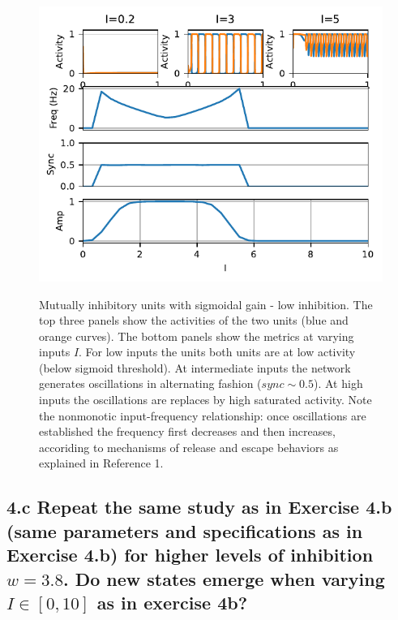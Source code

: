 \documentclass{cmc}
\begin{document}

\begin{figure}
	\centering \includegraphics[width=1\linewidth]{figures/coupled_inhibitory_units_-_low_inhibition_and_sigmoid_gain}\\
    \caption{Mutually inhibitory units with sigmoidal gain - low inhibition. The top three panels show the activities of the two units (blue and orange curves). The bottom panels show the metrics at varying inputs $I$. For low inputs the units both units are at low activity (below sigmoid threshold). At intermediate inputs the network generates oscillations in alternating fashion ($sync \sim 0.5$). At high inputs the oscillations are replaces by high saturated activity. Note the nonmonotic input-frequency relationship: once oscillations are established the frequency first decreases   and then increases, accoriding to mechanisms of release and escape behaviors as explained in Reference 1.
    \label{fig:plot_coupled_low_inhibition}}
\end{figure}



\subsection*{4.c Repeat the same study as in Exercise 4.b (same parameters and specifications as in
Exercise 4.b) for higher levels of inhibition $w=3.8$. Do new states emerge when varying $I \in [0,10]$ as in exercise 4b?}
\end{document}

